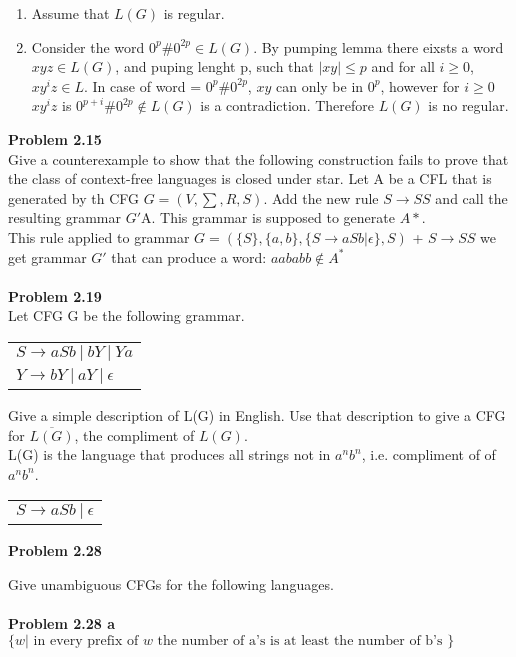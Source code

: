 \documentclass{article}
\newcommand\curl[1]{\{#1\}}
\newcommand{\problem}[1]{\large{\textbf{Problem #1} \\}}
\begin{document}
\begin{enumerate}[1., leftmargin = 0.5cm]
\itemsep0em
\item Assume that $L(G)$ is regular.
\item Consider the word $0^p\#0^{2p} \in L(G)$. By pumping lemma there eixsts a word $xyz \in L(G)$, and puping
lenght p, such that $|xy| \leq p$ and for all $i \geq 0$, $xy^iz \in L$. In case of word = $0^p \# 0^{2p}$, $xy$
can only be in $0^p$, however for $i \geq 0$ $xy^iz$ is $0^{p+i} \# 0^{2p} \notin L(G)$ is a contradiction. Therefore
$L(G)$ is no regular.
\end{enumerate}

\problem{2.15}
Give a counterexample to show that the following construction fails to prove that the class of context-free languages is closed under star.
Let A be a CFL that is generated by th CFG $G = (V,\sum,R,S)$. Add the new rule $S \rightarrow SS$ and call the
resulting grammar $G'$A. This grammar is supposed to generate $A*$. \\

This rule applied to grammar $G = (\curl{S},\curl{a,b},\curl{S\rightarrow aSb | \epsilon},S)$ + $S\rightarrow SS$ we get grammar $G'$
that can produce a word:
$aababb \notin A^*$ \\ \\

\problem{2.19}
Let  CFG G be the following grammar.
\begin{table}[h!]
\centering
\begin{tabular}{l}
$S \rightarrow a S b\: | \:b Y \:|\: Y a $\\
$Y \rightarrow b Y \:| \:a Y \:| \:\epsilon$
\end{tabular}
\end{table}

Give a simple description of L(G) in English. Use that description to give a CFG for $\overline{L(G)}$, the compliment of $L(G)$. \\

L(G) is the language that produces all strings not in $a^nb^n$, i.e. compliment of of $a^nb^n$.

\begin{table}[h!]
\centering
\begin{tabular}{l}
$S \rightarrow a S b\: | \: \epsilon$
\end{tabular}
\end{table}

\problem{2.28}

Give unambiguous CFGs for the following languages.\\ \\
\problem{2.28 a}
$\{w| \text{ in every prefix of } w \text{ the number of a's is at least the number of b's }\}$
\end{document}
